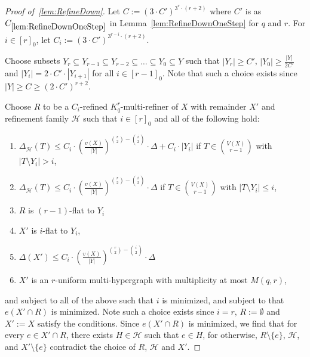 \documentclass[11pt]{article}
\newcounter{i}
\theoremstyle{plain}
\renewcommand{\theclaim}{\thetheorem.\arabic{claim}}
\newenvironment{lateproof}[1]
 {%
  \renewcommand{\theclaim}{\ref{#1}.\arabic{claim}}%
  \begin{proof}[Proof of~\cref{#1}]%
 }
 {\end{proof}}
\theoremstyle{plain} %
\theoremstyle{definition}
\begin{document}
\begin{lateproof}{lem:RefineDown}
Let $C:= \left(3\cdot C'\right)^{3^r\cdot (r+2)}$ where $C'$ is as $C_{\ref{lem:RefineDownOneStep}}$ in Lemma~\ref{lem:RefineDownOneStep} for $q$ and $r$. 
 For $i\in [r]_0$, let $C_i := \left(3\cdot C'\right)^{3^{r-i}\cdot (r+2)}$. 

Choose subsets $Y_r\subseteq Y_{r-1} \subseteq Y_{r-2} \subseteq \ldots \subseteq Y_0\subseteq Y$ such that $|Y_r| \ge C'$, $|Y_0| \ge \frac{|Y|}{2C'}$ and $|Y_i|= 2\cdot C'\cdot |Y_{i+1}|$ for all $i\in [r-1]_0$. Note that such a choice exists since $|Y|\ge C \ge (2\cdot C')^{r+2}$.

Choose $R$ to be a $C_i$-refined $K_q^r$-multi-refiner of $X$ with remainder $X'$ and refinement family $\mathcal{H}$ such that $i\in [r]_0$ and all of the following hold:

\begin{enumerate}
    \item[$(1)_i$] $\Delta_{\mathcal{H}}(T) \le C_i \cdot \left(\frac{v(X)}{|Y|}\right)^{\binom{r}{2}-\binom{i}{2}} \cdot \Delta+ C_i \cdot |Y_i|$ if $T\in \binom{V(X)}{r-1}$ with $|T\setminus Y_i| > i$,
    \item[$(2)_i$] $\Delta_{\mathcal{H}}(T) \le C_i \cdot \left(\frac{v(X)}{|Y|}\right)^{\binom{r}{2}-\binom{i}{2}} \cdot \Delta$ if $T\in \binom{V(X)}{r-1}$ with $|T\setminus Y_i|\le i$,
    \item[$(3)_i$] $R$ is $(r-1)$-flat to $Y_i$ %
    \item[$(4)_i$]   $X'$ is $i$-flat to $Y_{i}$,    
    \item[$(5)_i$] $\Delta(X')\le C_i\cdot \left(\frac{v(X)}{|Y|}\right)^{\binom{r}{2}-\binom{i}{2}} \cdot \Delta$
    \item[$(6)_i$] $X'$ is an $r$-uniform multi-hypergraph with multiplicity at most $M(q,r)$,
\end{enumerate}
and subject to all of the above such that $i$ is minimized, and subject to that $e(X'\cap R)$ is minimized. Note such a choice exists since $i=r$, $R:=\emptyset$ and $X':=X$ satisfy the conditions. Since $e(X'\cap R)$ is minimized, we find that for every $e\in X'\cap R$, there exists $H\in\mathcal{H}$ such that $e\in H$, for otherwise, $R\setminus \{e\}$, $\mathcal{H}$, and $X'\setminus \{e\}$ contradict the choice of $R$, $\mathcal{H}$ and $X'$.



\end{lateproof}
\end{document}
